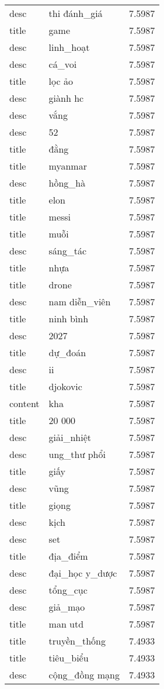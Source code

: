 \documentclass{article}
\begin{document}
\begin{tabular}{lll}
desc & thi đánh\_giá & 7.5987\\
title & game & 7.5987\\
desc & linh\_hoạt & 7.5987\\
desc & cá\_voi & 7.5987\\
title & lọc ảo & 7.5987\\
desc & giành hc & 7.5987\\
desc & vắng & 7.5987\\
desc & 52 & 7.5987\\
title & đằng & 7.5987\\
title & myanmar & 7.5987\\
desc & hồng\_hà & 7.5987\\
title & elon & 7.5987\\
title & messi & 7.5987\\
title & muỗi & 7.5987\\
desc & sáng\_tác & 7.5987\\
title & nhựa & 7.5987\\
title & drone & 7.5987\\
desc & nam diễn\_viên & 7.5987\\
title & ninh bình & 7.5987\\
desc & 2027 & 7.5987\\
title & dự\_đoán & 7.5987\\
desc & ii & 7.5987\\
title & djokovic & 7.5987\\
content & kha & 7.5987\\
title & 20 000 & 7.5987\\
desc & giải\_nhiệt & 7.5987\\
desc & ung\_thư phổi & 7.5987\\
title & giấy & 7.5987\\
desc & vũng & 7.5987\\
title & giọng & 7.5987\\
desc & kịch & 7.5987\\
desc & set & 7.5987\\
title & địa\_điểm & 7.5987\\
desc & đại\_học y\_dược & 7.5987\\
desc & tổng\_cục & 7.5987\\
desc & giả\_mạo & 7.5987\\
title & man utd & 7.5987\\
title & truyền\_thống & 7.4933\\
title & tiêu\_biểu & 7.4933\\
desc & cộng\_đồng mạng & 7.4933\\

\end{tabular}
\end{document}

